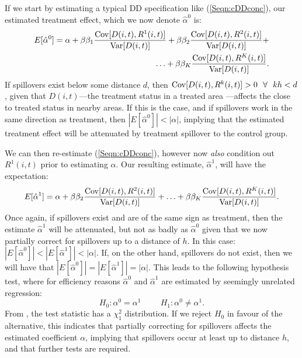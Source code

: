 If we start by estimating a typical DD specification like (\ref{Seqn:cDDconc}),
our estimated treatment effect, which we now denote $\hat\alpha^0$ is:
\begin{equation}
\nonumber
\begin{split}
E[\hat\alpha^0]=\alpha + \beta\beta_1\frac{\mathrm{Cov}[D(i,t),R^1(i,t)]}{\mathrm{Var}[D(i,t)]}
                                + \beta\beta_2\frac{\mathrm{Cov}[D(i,t),R^2(i,t)]}{\mathrm{Var}[D(i,t)]}
                                + \\ \ldots
                                + \beta\beta_K\frac{\mathrm{Cov}[D(i,t),R^K(i,t)]}{\mathrm{Var}[D(i,t)]}.
\end{split}
\end{equation}
If spillovers exist below some distance $d$, then $\Cov[D(i,t),R^k(i,t)]>0 \ \ 
\forall \ \ kh<d$, given that $D(i,t)$---the treatment status in a treated area%
---affects the close to treated status in nearby areas. If this is the case, and 
if spillovers work in the same direction as treatment, then 
$|E[\hat\alpha^0]|<|\alpha|$, implying that the estimated treatment 
effect will be attenuated by treatment spillover to the control group.  

We can then re-estimate (\ref{Seqn:cDDconc}), however now \emph{also} condition
out $R^1(i,t)$ prior to estimating $\alpha$.  Our resulting estimate, 
$\hat\alpha^1$, will have the expectation:
\begin{equation}
\nonumber
\begin{split}
E[\hat\alpha^1]=\alpha + \beta\beta_2\frac{\mathrm{Cov}[D(i,t),R^2(i,t)]}{\mathrm{Var}[D(i,t)]}
                                + \ldots
                                + \beta\beta_K\frac{\mathrm{Cov}[D(i,t),R^K(i,t)]}{\mathrm{Var}[D(i,t)]}.
\end{split}
\end{equation}
Once again, if spillovers exist and are of the same sign as treatment, then the
estimate $\hat\alpha^1$ will be attenuated, but not as badly as $\hat\alpha^0$ 
given that we now partially correct for spillovers up to a distance of $h$.  In 
this case: $|E[\hat\alpha^0]|<|E[\hat\alpha^1]|<|\alpha|$.  If, on the other 
hand, spillovers do not exist, then we will have that 
$|E[\hat\alpha^0]|=|E[\hat\alpha^1]|=|\alpha|$.  This leads to 
the following hypothesis test, where for efficiency reasons $\hat\alpha^0$
and $\hat\alpha^1$ are estimated by seemingly unrelated regression:
\[
H_0: \alpha^0=\alpha^1 \hspace{1cm}
H_1: \alpha^0\neq\alpha^1.
\]
From \citet{Zellner1962}, the test statistic has a $\chi^2_1$ distribution. If 
we reject $H_0$ in favour of the alternative, this indicates that partially 
correcting for spillovers affects the estimated coefficient $\alpha$, implying 
that spillovers occur at least up to distance $h$, and that further tests are 
required.  

